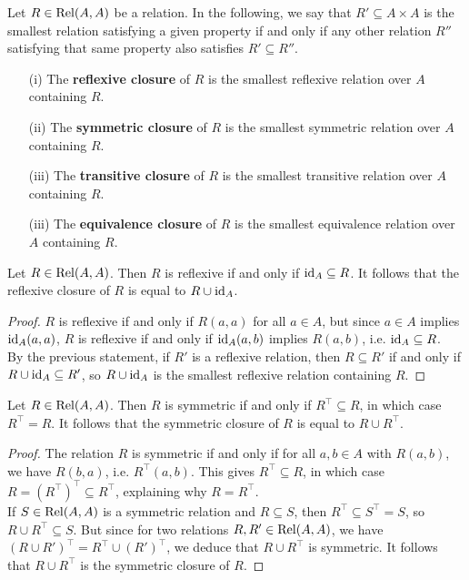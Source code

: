 \begin{definition}[Closures]
    Let $R \in \mathrm{Rel}(A,A)$ be a relation. In the following, we say that $R' \subseteq A \times A$ is the smallest relation satisfying a given property if and only if any other relation $R''$ satisfying that same property also satisfies $R' \subseteq R''$. 
    \begin{itemize}
        \item[(i)] The \textbf{reflexive closure} of $R$ is the smallest reflexive relation over $A$ containing $R$. 
        \item[(ii)] The \textbf{symmetric closure} of $R$ is the smallest symmetric relation over $A$ containing $R$.
        \item[(iii)] The \textbf{transitive closure} of $R$ is the smallest transitive relation over $A$ containing $R$.
        \item[(iii)] The \textbf{equivalence closure} of $R$ is the smallest equivalence relation over $A$ containing $R$. 
    \end{itemize}
\end{definition}

\begin{proposition} \label{characterization-of-reflexive-closure}
    Let $R \in \mathrm{Rel}(A,A)$. Then $R$ is reflexive if and only if $\operatorname{\mathrm{id}}_{A} \subseteq R$. It follows that the reflexive closure of $R$ is equal to $R \cup \operatorname{\mathrm{id}}_{A}$. 
\end{proposition}

\begin{proof}
    $R$ is reflexive if and only if $R(a,a)$ for all $a \in A$, but since $a \in A$ implies $\operatorname{\mathrm{id}}_{A}(a,a)$, $R$ is reflexive if and only if $\operatorname{\mathrm{id}}_{A}(a,b)$ implies $R(a,b)$, i.e. $\operatorname{\mathrm{id}}_{A} \subseteq R$. 
    \\

    By the previous statement, if $R'$ is a reflexive relation, then $R \subseteq R'$ if and only if $R \cup \operatorname{\mathrm{id}}_{A} \subseteq R'$, so $R \cup \operatorname{\mathrm{id}}_{A}$ is the smallest reflexive relation containing $R$. 
\end{proof}

\begin{proposition} \label{characterization-of-symmetric-closure}
    Let $R \in \mathrm{Rel}(A,A)$. Then $R$ is symmetric if and only if $R^{\top} \subseteq R$, in which case $R^{\top} = R$. It follows that the symmetric closure of $R$ is equal to $R \cup R^{\top}$.
\end{proposition}

\begin{proof}
    The relation $R$ is symmetric if and only if for all $a,b \in A$ with $R(a,b)$, we have $R(b,a)$, i.e. $R^{\top}(a,b)$. This gives $R^{\top} \subseteq R$, in which case $R = (R^{\top})^{\top} \subseteq R^{\top}$, explaining why $R = R^{\top}$. 
    \\

    If $S \in \mathrm{Rel}(A,A)$ is a symmetric relation and $R \subseteq S$, then $R^{\top} \subseteq S^{\top} = S$, so $R \cup R^{\top} \subseteq S$. But since for two relations $R,R' \in \mathrm{Rel}(A,A)$, we have $(R \cup R')^{\top} = R^{\top} \cup (R')^{\top}$, we deduce that $R \cup R^{\top}$ is symmetric. It follows that $R \cup R^{\top}$ is the symmetric closure of $R$. 
\end{proof}
